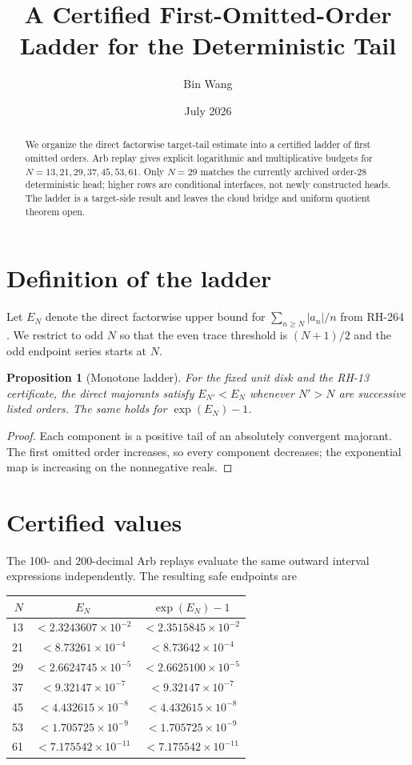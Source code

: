 \documentclass[11pt]{article}
\title{A Certified First-Omitted-Order Ladder for the Deterministic Tail}
\author{Bin Wang}\date{July 2026}
\newtheorem{proposition}[theorem]{Proposition}
\begin{document}
\maketitle

\begin{abstract}
We organize the direct factorwise target-tail estimate into a certified ladder
of first omitted orders.  Arb replay gives explicit logarithmic and
multiplicative budgets for $N=13,21,29,37,45,53,61$.  Only $N=29$ matches the
currently archived order-28 deterministic head; higher rows are conditional
interfaces, not newly constructed heads.  The ladder is a target-side result
and leaves the cloud bridge and uniform quotient theorem open.
\end{abstract}

\section{Definition of the ladder}
Let $E_N$ denote the direct factorwise upper bound for
$\sum_{n\ge N}|a_n|/n$ from RH-264 \citep{WangRH264}.  We restrict to odd
$N$ so that the even trace threshold is $(N+1)/2$ and the odd endpoint series
starts at $N$.

\begin{proposition}[Monotone ladder]
For the fixed unit disk and the RH-13 certificate, the direct majorants satisfy
$E_{N'}<E_N$ whenever $N'>N$ are successive listed orders.  The same holds
for $\exp(E_N)-1$.
\end{proposition}

\begin{proof}
Each component is a positive tail of an absolutely convergent majorant.  The
first omitted order increases, so every component decreases; the exponential
map is increasing on the nonnegative reals.
\end{proof}

\section{Certified values}
The 100- and 200-decimal Arb replays evaluate the same outward interval
expressions independently.  The resulting safe endpoints are
\begin{center}
\small
\begin{tabular}{rcc}
\toprule
$N$ & $E_N$ & $\exp(E_N)-1$\\
\midrule
13 & $<2.3243607\times10^{-2}$ & $<2.3515845\times10^{-2}$\\
21 & $<8.73261\times10^{-4}$ & $<8.73642\times10^{-4}$\\
29 & $<2.6624745\times10^{-5}$ & $<2.6625100\times10^{-5}$\\
37 & $<9.32147\times10^{-7}$ & $<9.32147\times10^{-7}$\\
45 & $<4.432615\times10^{-8}$ & $<4.432615\times10^{-8}$\\
53 & $<1.705725\times10^{-9}$ & $<1.705725\times10^{-9}$\\
61 & $<7.175542\times10^{-11}$ & $<7.175542\times10^{-11}$\\
\bottomrule
\end{tabular}
\end{center}
\end{document}
